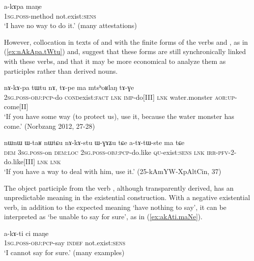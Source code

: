 \begin{exe}
\ex \label{ex:akApa.maNe}
\gll a-kɤpa maŋe \\
\textsc{1sg}.\textsc{poss}-method not.exist:\textsc{sens} \\
\glt `I have no way to do it.' (many attestations)
\end{exe}
 
However, collocation in texts of  and  with the finite forms of the verbs  and , as in (\ref{ex:nAkApa.tWtu}) and, suggest that these forms are still synchronically linked with these verbs, and that it may be more economical to analyze them as participles rather than derived nouns.
 
 \begin{exe}
\ex \label{ex:nAkApa.tWtu}
\gll  nɤ-kɤ-pa tɯ\redp{}tu nɤ,  tɤ-pe ma mtsʰoʁlaŋ tɤ-ɣe  \\
\textsc{2sg}.\textsc{poss}-\textsc{obj}:\textsc{pcp}-do \textsc{cond}\redp{}exist:\textsc{fact} \textsc{lnk} \textsc{imp}-do[III] \textsc{lnk} water.monster \textsc{aor}:\textsc{up}-come[II] \\
\glt `If you have some way (to protect us), use it, because the water monster has come.' (Norbzang 2012, 27-28)
 \end{exe}
 
  \begin{exe}
\ex \label{ex:nAkAstu.WGAZu}
\gll   nɯnɯ ɯ-taʁ nɯtɕu nɤ-kɤ-stu ɯ-ɣɤʑu tɕe a-tɤ-tɯ-ste ma tɕe \\
\textsc{dem} \textsc{3sg}.\textsc{poss}-on \textsc{dem}:\textsc{loc} \textsc{2sg}.\textsc{poss}-\textsc{obj}:\textsc{pcp}-do.like \textsc{qu}-exist:\textsc{sens} \textsc{lnk} \textsc{irr}-\textsc{pfv}-2-do.like[III] \textsc{lnk} \textsc{lnk} \\
\glt `If you have a way to deal with him, use it.'   (25-kAmYW-XpAltCin, 37)
 \end{exe}
 
The object participle  from the verb , although transparently derived, has an unpredictable meaning in the existential construction. With a negative existential verb, in addition to the expected meaning `have nothing to say', it can be interpreted as `be unable to say for sure', as in (\ref{ex:akAti.maNe}).

  \begin{exe}
\ex \label{ex:akAti.maNe}
\gll    a-kɤ-ti ci maŋe \\
 \textsc{1sg}.\textsc{poss}-\textsc{obj}:\textsc{pcp}-say \textsc{indef} not.exist:\textsc{sens} \\
 \glt `I cannot say for sure.' (many examples)
  \end{exe}
  
